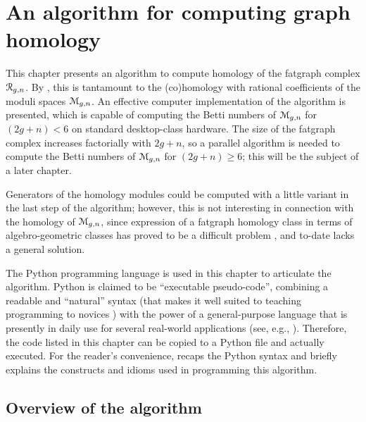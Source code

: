 
\chapter[An algorithm for graph homology]
  {An algorithm for computing graph homology}
\label{chap:algorithm}

This chapter presents an algorithm to compute homology of the fatgraph
complex $\mathcal{R}_{g,n}$.  By , this is
tantamount to the (co)homology with rational coefficients of the
moduli spaces $\mathcal{M}_{g,n}$. An effective computer implementation of the
algorithm is presented, which is capable of computing the Betti
numbers of $\mathcal{M}_{g,n}$ for $(2g+n) < 6$ on standard desktop-class
hardware.  The size of the fatgraph complex increases factorially with
$2g+n$, so a parallel algorithm is needed to compute the Betti numbers
of $\mathcal{M}_{g,n}$ for $(2g+n) \geq 6$; this will be the subject of a later
chapter.

Generators of the homology modules could be computed with a little
variant in the last step of the algorithm; however, this is not
interesting in connection with the homology of $\mathcal{M}_{g,n}$, since
expression of a fatgraph homology class in terms of algebro-geometric
classes has proved to be a difficult problem 
\cite{mondello:2004,
  igusa:combinatorial-miller-morita-mumford-classes-and-witten-cycles,
  igusa:graph-cohomology-and-kontsevich-cycles},
and to-date lacks a general solution.

The Python programming language is used in this chapter to articulate
the algorithm.  Python is claimed to be ``executable pseudo-code'',
combining a readable and ``natural'' syntax (that makes it well suited
to teaching programming to novices \cite{georgatos:python}) with the
power of a general-purpose language that is presently in daily use for
several real-world applications (see, e.g., \cite{python:success}).
Therefore, the code listed in this chapter can be copied to a Python
file and actually executed.  For the reader's convenience,
 recaps the Python syntax and briefly explains the
constructs and idioms used in programming this algorithm.


\section[Overview]{Overview of the algorithm}
\label{sec:overview}

